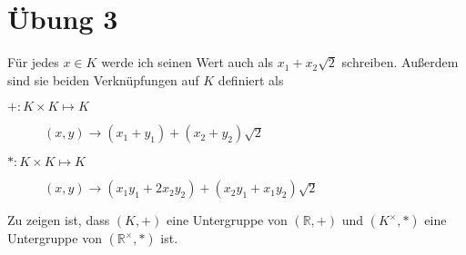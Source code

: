 \documentclass[a4paper,10pt]{article}
\begin{document}
\section*{Übung 3}

Für jedes $x \in K$ werde ich seinen Wert auch als $x_1 + x_2\sqrt{2}$ schreiben.
Außerdem sind sie beiden Verknüpfungen auf $K$ definiert als
\begin{description}
 \item[$+: K \times K \mapsto K$] $(x, y) \rightarrow (x_1 + y_1) + (x_2 + y_2)\sqrt{2}$
 \item[$*: K \times K \mapsto K$] $(x, y) \rightarrow (x_1y_1 + 2x_2y_2) + (x_2y_1 + x_1y_2)\sqrt{2}$
\end{description}

Zu zeigen ist, dass $(K, +)$ eine Untergruppe von $(\mathbb{R}, +)$ und $(K^\times, *)$ eine Untergruppe von $(\mathbb{R}^\times, *)$ ist.
\end{document}
